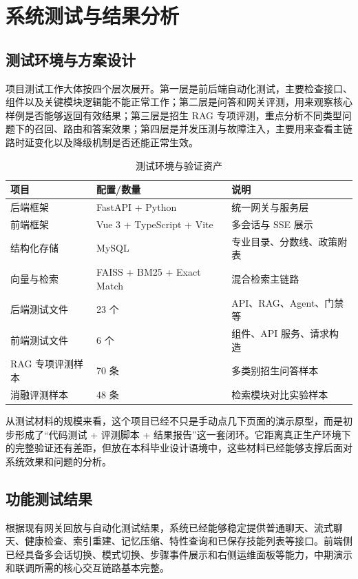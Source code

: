 \documentclass[UTF8,zihao=-4,oneside]{ctexbook}
\numberwithin{equation}{chapter}
\begin{document}
\chapter{系统测试与结果分析}

\section{测试环境与方案设计}
项目测试工作大体按四个层次展开。第一层是前后端自动化测试，主要检查接口、组件以及关键模块逻辑能不能正常工作；第二层是问答和网关评测，用来观察核心样例是否能够返回有效结果；第三层是招生 RAG 专项评测，重点分析不同类型问题下的召回、路由和答案效果；第四层是并发压测与故障注入，主要用来查看主链路时延变化以及降级机制是否还能正常生效。

\begin{table}[H]
  \centering
  \caption{测试环境与验证资产}
  \begin{tabularx}{0.95\textwidth}{lYY}
    \toprule
    项目 & 配置/数量 & 说明 \\
    \midrule
    后端框架 & FastAPI + Python & 统一网关与服务层 \\
    前端框架 & Vue 3 + TypeScript + Vite & 多会话与 SSE 展示 \\
    结构化存储 & MySQL & 专业目录、分数线、政策附表 \\
    向量与检索 & FAISS + BM25 + Exact Match & 混合检索主链路 \\
    后端测试文件 & 23 个 & API、RAG、Agent、门禁等 \\
    前端测试文件 & 6 个 & 组件、API 服务、请求构造 \\
    RAG 专项评测样本 & 70 条 & 多类别招生问答样本 \\
    消融评测样本 & 48 条 & 检索模块对比实验样本 \\
    \bottomrule
  \end{tabularx}
\end{table}

从测试材料的规模来看，这个项目已经不只是手动点几下页面的演示原型，而是初步形成了“代码测试 + 评测脚本 + 结果报告”这一套闭环。它距离真正生产环境下的完整验证还有差距，但放在本科毕业设计语境中，这些材料已经能够支撑后面对系统效果和问题的分析。

\section{功能测试结果}
根据现有网关回放与自动化测试结果，系统已经能够稳定提供普通聊天、流式聊天、健康检查、索引重建、记忆压缩、特性查询和已保存技能列表等接口\cite{projectreadme,gateevalreport}。前端侧已经具备多会话切换、模式切换、步骤事件展示和右侧运维面板等能力，中期演示和联调所需的核心交互链路基本完整。
\end{document}
